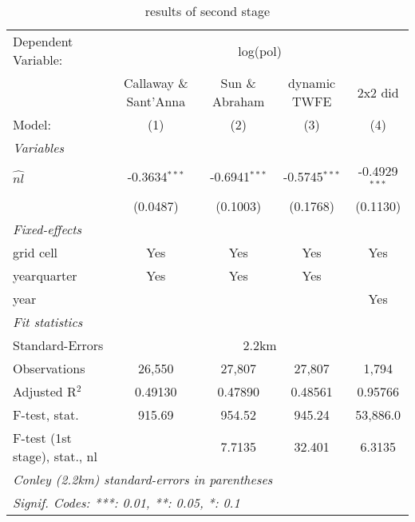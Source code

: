 
\begin{table}[H]
   \caption{\label{tab:estimates0.02} results of second stage}
   \centering
   \begin{adjustbox}{width = \textwidth, center}
      \begin{tabular}{lcccc}
         \tabularnewline \midrule \midrule
         Dependent Variable: & \multicolumn{4}{c}{log(pol)}\\
          & Callaway \& Sant'Anna & Sun \& Abraham & dynamic TWFE &  2x2 did \\ 
         Model:                        & (1)             & (2)             & (3)             & (4)\\  
         \midrule
         \emph{Variables}\\
         $\widehat{nl}$                & -0.3634$^{***}$ & -0.6941$^{***}$ & -0.5745$^{***}$ & -0.4929$^{***}$\\   
                                       & (0.0487)        & (0.1003)        & (0.1768)        & (0.1130)\\   
         \midrule
         \emph{Fixed-effects}\\
         grid cell                     & Yes             & Yes             & Yes             & Yes\\  
         yearquarter                   & Yes             & Yes             & Yes             & \\  
         year                          &                 &                 &                 & Yes\\  
         \midrule
         \emph{Fit statistics}\\
         Standard-Errors & \multicolumn{4}{c}{2.2km} \\ 
         Observations                  & 26,550          & 27,807          & 27,807          & 1,794\\  
         Adjusted R$^2$                & 0.49130         & 0.47890         & 0.48561         & 0.95766\\  
         F-test, stat.                 & 915.69          & 954.52          & 945.24          & 53,886.0\\  
         F-test (1st stage), stat., nl &                 & 7.7135          & 32.401          & 6.3135\\  
         \midrule \midrule
         \multicolumn{5}{l}{\emph{Conley (2.2km) standard-errors in parentheses}}\\
         \multicolumn{5}{l}{\emph{Signif. Codes: ***: 0.01, **: 0.05, *: 0.1}}\\
      \end{tabular}
   \end{adjustbox}
\end{table}


